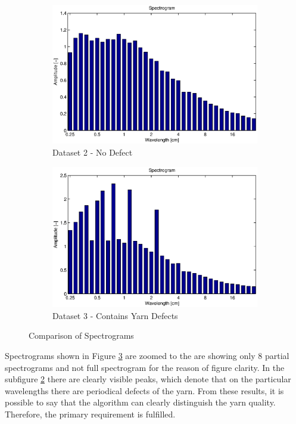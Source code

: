 \documentclass[twoside]{ctuthesis}
\theoremstyle{plain}
\theoremstyle{definition}
\theoremstyle{note}
\begin{document}
\begin{figure}
	\centering
	\begin{subfigure}{0.5\textwidth}
		\centering
		\includegraphics[width=1.0\linewidth]{prize1_short.eps}
		\caption{Dataset 2 - No Defect}
		\label{fig:specData2}
	\end{subfigure}%
	\begin{subfigure}{0.5\textwidth}
		\centering
		\includegraphics[width=1.0\linewidth]{moire1.eps}
		\caption{Dataset 3 - Contains Yarn Defects}
		\label{fig:specData3}
	\end{subfigure}
	\caption{Comparison of Spectrograms}
	\label{fig:specComparison}
\end{figure}

Spectrograms shown in Figure \ref{fig:specComparison} are zoomed to the are showing only 8 partial spectrograms and not full spectrogram for the reason of figure clarity. In the subfigure \ref{fig:specData3} there are clearly visible peaks, which denote that on the particular wavelengths there are periodical defects of the yarn. From these results, it is possible to say that the algorithm can clearly distinguish the yarn quality. Therefore, the primary requirement is fulfilled.
\end{document}
